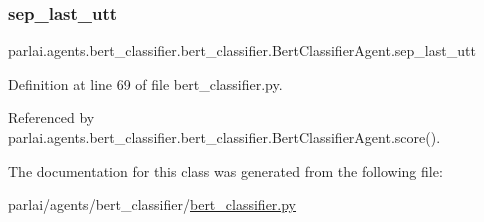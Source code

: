 \subsubsection{\texorpdfstring{sep\+\_\+last\+\_\+utt}{sep\_last\_utt}}
{\footnotesize\ttfamily parlai.\+agents.\+bert\+\_\+classifier.\+bert\+\_\+classifier.\+Bert\+Classifier\+Agent.\+sep\+\_\+last\+\_\+utt}



Definition at line 69 of file bert\+\_\+classifier.\+py.



Referenced by parlai.\+agents.\+bert\+\_\+classifier.\+bert\+\_\+classifier.\+Bert\+Classifier\+Agent.\+score().



The documentation for this class was generated from the following file\+:\begin{DoxyCompactItemize}
\item 
parlai/agents/bert\+\_\+classifier/\hyperlink{bert__classifier_8py}{bert\+\_\+classifier.\+py}\end{DoxyCompactItemize}
